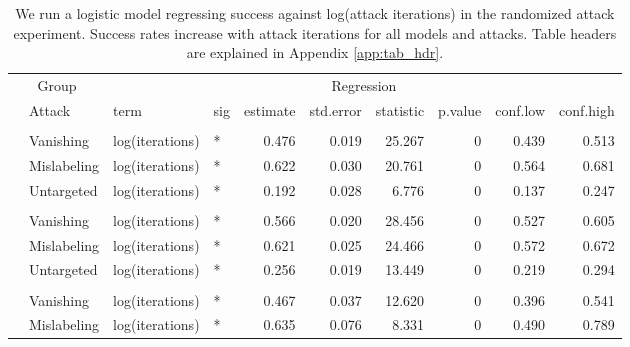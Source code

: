 \documentclass[
]{article}
\begin{document}
\begingroup\fontsize{9}{11}\selectfont

\begin{longtable}[t]{llllrrrrrr}
\caption{\label{tab:num_iteration_table}We run a logistic model regressing success against log(attack iterations) in the randomized attack experiment. Success rates increase with attack iterations for all models and attacks. Table headers are explained in Appendix \ref{app:tab_hdr}.}\\
\toprule
\multicolumn{2}{c}{Group} & \multicolumn{8}{c}{Regression} \\
\cmidrule(l{3pt}r{3pt}){1-2} \cmidrule(l{3pt}r{3pt}){3-10}
 & Attack & term & sig & estimate & std.error & statistic & p.value & conf.low & conf.high\\
\midrule
\addlinespace[0.3em]
\multicolumn{10}{l}{\textbf{YOLOv3}}\\
\hspace{1em} & Vanishing & log(iterations) & * & 0.476 & 0.019 & 25.267 & 0 & 0.439 & 0.513\\
\cmidrule{2-10}\nopagebreak
\hspace{1em} & Mislabeling & log(iterations) & * & 0.622 & 0.030 & 20.761 & 0 & 0.564 & 0.681\\
\cmidrule{2-10}\nopagebreak
\hspace{1em} & Untargeted & log(iterations) & * & 0.192 & 0.028 & 6.776 & 0 & 0.137 & 0.247\\
\cmidrule{1-10}\pagebreak[0]
\addlinespace[0.3em]
\multicolumn{10}{l}{\textbf{SSD}}\\
\hspace{1em} & Vanishing & log(iterations) & * & 0.566 & 0.020 & 28.456 & 0 & 0.527 & 0.605\\
\cmidrule{2-10}\nopagebreak
\hspace{1em} & Mislabeling & log(iterations) & * & 0.621 & 0.025 & 24.466 & 0 & 0.572 & 0.672\\
\cmidrule{2-10}\nopagebreak
\hspace{1em} & Untargeted & log(iterations) & * & 0.256 & 0.019 & 13.449 & 0 & 0.219 & 0.294\\
\cmidrule{1-10}\pagebreak[0]
\addlinespace[0.3em]
\multicolumn{10}{l}{\textbf{RetinaNet}}\\
\hspace{1em} & Vanishing & log(iterations) & * & 0.467 & 0.037 & 12.620 & 0 & 0.396 & 0.541\\
\cmidrule{2-10}\nopagebreak
\hspace{1em} & Mislabeling & log(iterations) & * & 0.635 & 0.076 & 8.331 & 0 & 0.490 & 0.789\\

\end{longtable}
\end{document}
